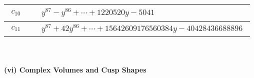 \documentclass[1p]{elsarticle_modified}
\theoremstyle{definition}
\begin{document}
\begin{tabular}{m{50pt}|m{274pt}}
\hline $$\begin{aligned}c_{10}\end{aligned}$$&$\begin{aligned}
&y^{87}- y^{86}+\cdots+1220520 y-5041
\end{aligned}$\\
\hline $$\begin{aligned}c_{11}\end{aligned}$$&$\begin{aligned}
&y^{87}+42 y^{86}+\cdots+15642609176560384 y-40428436688896
\end{aligned}$\\
\hline
\end{tabular}\\~\\
\newpage\flushleft \textbf{(vi) Complex Volumes and Cusp Shapes}
\end{document}
